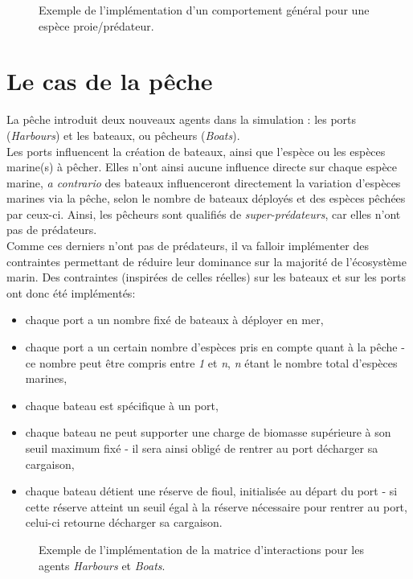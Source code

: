 \begin{figure}[htbp]
	\makebox[\textwidth]{\hrulefill}{
	\small
	
	\normalsize}
	\caption{Exemple de l'implémentation d'un comportement général pour une espèce proie/prédateur.}
	\label{fig:recap_agents}
\end{figure}

\section{Le cas de la pêche}

La pêche introduit deux nouveaux agents dans la simulation : les ports (\textit{Harbours}) et les bateaux, ou pêcheurs (\textit{Boats}).
\\
Les ports influencent la création de bateaux, ainsi que l'espèce ou les espèces marine(s) à pêcher. Elles n'ont ainsi aucune influence directe sur chaque espèce marine, \textit{a contrario} des bateaux influenceront directement la variation d'espèces marines via la pêche, selon le nombre de bateaux déployés et des espèces pêchées par ceux-ci. Ainsi, les pêcheurs sont qualifiés de \textit{super-prédateurs}, car elles n'ont pas de prédateurs.
\\
Comme ces derniers n'ont pas de prédateurs, il va falloir implémenter des contraintes permettant de réduire leur dominance sur la majorité de l'écosystème marin. Des contraintes (inspirées de celles réelles) sur les bateaux et sur les ports ont donc été implémentés:
\begin{itemize}
\item{chaque port a un nombre fixé de bateaux à déployer en mer,}
\item{chaque port a un certain nombre d'espèces pris en compte quant à la pêche - ce nombre peut être compris entre \textit{1} et \textit{n}, \textit{n} étant le nombre total d'espèces marines,}
\item{chaque bateau est spécifique à un port,}
\item{chaque bateau ne peut supporter une charge de biomasse supérieure à son seuil maximum fixé - il sera ainsi obligé de rentrer au port décharger sa cargaison,}
\item{chaque bateau détient une réserve de fioul, initialisée au départ du port - si cette réserve atteint un seuil égal à la réserve nécessaire pour rentrer au port, celui-ci retourne décharger sa cargaison.}
\end{itemize}

\begin{figure}[htbp]
	\makebox[\textwidth]{\hrulefill}{
	\small
	
	\normalsize}
	\caption{Exemple de l'implémentation de la matrice d'interactions pour les agents \textit{Harbours} et \textit{Boats}.}
	\label{fig:matrix_harbours_boats}
\end{figure}

